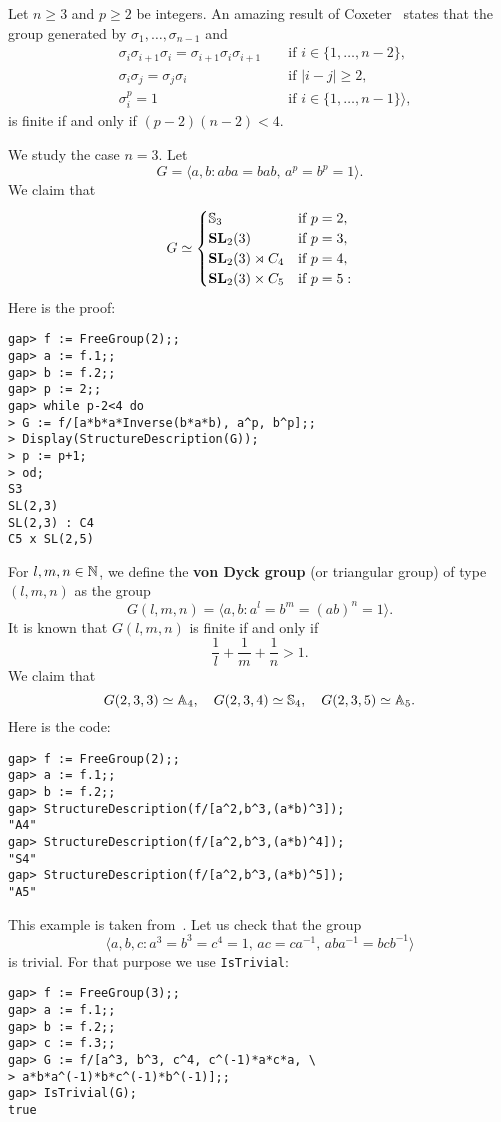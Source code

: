 \begin{example}
\label{xca:Coxeter}
Let $n\geq3$ and $p\geq2$ be integers. An amazing result of
Coxeter~\cite{MR1330458} states that the group generated by
$\sigma_1,\dots,\sigma_{n-1}$ and 
\begin{align*}
    &\sigma_i\sigma_{i+1}\sigma_i=\sigma_{i+1}\sigma_i\sigma_{i+1} && \text{ if $i\in\{1,\dots,n-2\}$},\\
    &\sigma_i\sigma_j=\sigma_j\sigma_i && \text{ if $|i-j|\geq 2$},\\
    &\sigma_i^p=1 && \text{ if $i\in\{1,\dots,n-1\}$}\rangle,
\end{align*}
is finite if and only if $(p-2)(n-2)<4$.  

We study the case $n=3$. Let 
\[
G=\langle a,b:aba=bab,\,a^p=b^p=1\rangle.
\]
We claim that 
\[
G\simeq\begin{cases}
    \mathbb{S}_3 & \text{if $p=2$},\\
    \mathbf{SL}_2(3) & \text{if $p=3$},\\
    \mathbf{SL}_2(3)\rtimes C_4 & \text{if $p=4$},\\
    \mathbf{SL}_2(3)\times C_5 & \text{if $p=5$}:
\end{cases}
\]
Here is the proof:
\begin{lstlisting}
gap> f := FreeGroup(2);;
gap> a := f.1;;
gap> b := f.2;;
gap> p := 2;;
gap> while p-2<4 do
> G := f/[a*b*a*Inverse(b*a*b), a^p, b^p];;
> Display(StructureDescription(G));
> p := p+1;
> od;
S3
SL(2,3)
SL(2,3) : C4
C5 x SL(2,5)    
\end{lstlisting}
\end{example}

\begin{example}
For $l,m,n\in\mathbb{N}$, we define the \textbf{von Dyck group} (or triangular group)
of type $(l,m,n)$ as the group
\[
G(l,m,n)=\langle
a,b:a^l=b^m=(ab)^n=1\rangle.
\]
It is known that $G(l,m,n)$ is finite if and only if 
\[
\frac{1}{l}+\frac{1}{m}+\frac{1}{n}>1.
\]
We claim that 
\[
G(2,3,3)\simeq\mathbb{A}_4, \quad
G(2,3,4)\simeq\mathbb{S}_4,\quad
G(2,3,5)\simeq\mathbb{A}_5. 
\]
Here is the code:
\begin{lstlisting}
gap> f := FreeGroup(2);;
gap> a := f.1;;
gap> b := f.2;;
gap> StructureDescription(f/[a^2,b^3,(a*b)^3]);
"A4"
gap> StructureDescription(f/[a^2,b^3,(a*b)^4]);
"S4"
gap> StructureDescription(f/[a^2,b^3,(a*b)^5]);
"A5"
\end{lstlisting}
\end{example}

\begin{example}
This example is taken from~\cite{MR1786869}. Let us check that the group
\[
\langle a,b,c:a^3=b^3=c^4=1,\,ac=ca^{-1},\,aba^{-1}=bcb^{-1}\rangle
\]
is trivial. For that purpose we use \lstinline{IsTrivial}:
\begin{lstlisting}
gap> f := FreeGroup(3);;
gap> a := f.1;;
gap> b := f.2;;
gap> c := f.3;;
gap> G := f/[a^3, b^3, c^4, c^(-1)*a*c*a, \
> a*b*a^(-1)*b*c^(-1)*b^(-1)];;
gap> IsTrivial(G);
true
\end{lstlisting}
\end{example}

